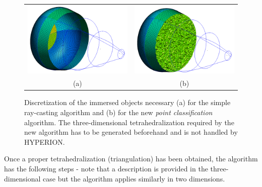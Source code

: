 \begin{figure}
    \centering
    \begin{tabular}{cc}
        \includegraphics[width=0.45\linewidth]{chapter3_numerical_methods/pictures/funny_onion_shell.png} &
        \includegraphics[width=0.45\linewidth]{chapter3_numerical_methods/pictures/funny_onion_threeD.png} \\
        (a) & (b)
    \end{tabular}
    \caption{Discretization of the immersed objects necessary (a) for the simple ray-casting algorithm and (b) for the new \emph{point classification} algorithm.
    The three-dimensional tetrahedralization required by the new algorithm has to be generated beforehand and is not handled by HYPERION.}
    \label{fig:object_discretization}
\end{figure}

Once a proper tetrahedralization (triangulation) has been obtained, the algorithm has the following steps - note that a description is provided in the three-dimensional case but the algorithm applies similarly in two dimensions.

